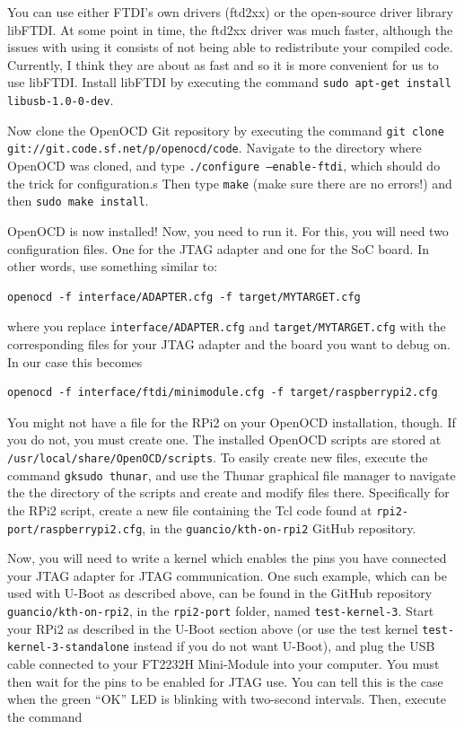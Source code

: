 \documentclass[a4paper,11pt,reqno]{amsart}
\begin{document}
You can use either FTDI's own drivers (ftd2xx) or the open-source driver library libFTDI. At some point in time, the ftd2xx driver was much faster, although the issues with using it consists of not being able to redistribute your compiled code. Currently, I think they are about as fast and so it is more convenient for us to use libFTDI. Install libFTDI by executing the command \texttt{sudo apt-get install libusb-1.0-0-dev}.

Now clone the OpenOCD Git repository by executing the command \texttt{git clone git://git.code.sf.net/p/openocd/code}. Navigate to the directory where OpenOCD was cloned, and type \texttt{./configure --enable-ftdi}, which should do the trick for configuration.s Then type \texttt{make} (make sure there are no errors!) and then \texttt{sudo make install}.

OpenOCD is now installed! Now, you need to run it. For this, you will need two configuration files. One for the JTAG adapter and one for the SoC board. In other words, use something similar to:

\begin{verbatim}
openocd -f interface/ADAPTER.cfg -f target/MYTARGET.cfg
\end{verbatim}

where you replace \texttt{interface/ADAPTER.cfg} and \texttt{target/MYTARGET.cfg} with the corresponding files for your JTAG adapter and the board you want to debug on. In our case this becomes

\begin{verbatim}
openocd -f interface/ftdi/minimodule.cfg -f target/raspberrypi2.cfg
\end{verbatim}

You might not have a file for the RPi2 on your OpenOCD installation, though. If you do not, you must create one. The installed OpenOCD scripts are stored at \texttt{/usr/local/share/OpenOCD/scripts}. To easily create new files, execute the command \texttt{gksudo thunar}, and use the Thunar graphical file manager to navigate the the directory of the scripts and create and modify files there. Specifically for the RPi2 script, create a new file containing the Tcl code found at \texttt{rpi2-port/raspberrypi2.cfg}, in the \texttt{guancio/kth-on-rpi2} GitHub repository.

Now, you will need to write a kernel which enables the pins you have connected your JTAG adapter for JTAG communication. One such example, which can be used with U-Boot as described above, can be found in the GitHub repository \texttt{guancio/kth-on-rpi2}, in the \texttt{rpi2-port} folder, named \texttt{test-kernel-3}. Start your RPi2 as described in the U-Boot section above (or use the test kernel \texttt{test-kernel-3-standalone} instead if you do not want U-Boot), and plug the USB cable connected to your FT2232H Mini-Module into your computer. You must then wait for the pins to be enabled for JTAG use. You can tell this is the case when the green ``OK'' LED is blinking with two-second intervals. Then, execute the command
\end{document}
